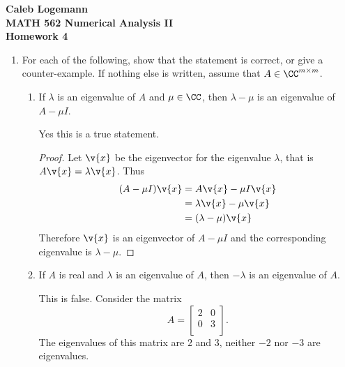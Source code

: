 \documentclass[11pt]{article}
\begin{document}
\noindent \textbf{\Large{Caleb Logemann \\
MATH 562 Numerical Analysis II \\
Homework 4
}}

%
\begin{enumerate}
    \item %
        For each of the following, show that the statement is correct, or give
        a counter-example. 
        If nothing else is written, assume that $A \in \CC^{m \times m}$.
        \begin{enumerate}
            \item %
                If $\lambda$ is an eigenvalue of $A$ and $\mu \in \CC$, then
                $\lambda - \mu$ is an eigenvalue of $A - \mu I$.

                Yes this is a true statement.
                \begin{proof}
                    Let $\v{x}$ be the eigenvector for the eigenvalue $\lambda$,
                    that is $A\v{x} = \lambda \v{x}$.
                    Thus
                    \begin{align*}
                        (A - \mu I)\v{x} &= A\v{x} - \mu I \v{x} \\
                                         &= \lambda \v{x} - \mu \v{x} \\
                                         &= (\lambda - \mu) \v{x}
                    \end{align*}
                    Therefore $\v{x}$ is an eigenvector of $A - \mu I$ and the
                    corresponding eigenvalue is $\lambda - \mu$.
                \end{proof}

            \item %
                If $A$ is real and $\lambda$ is an eigenvalue of $A$, then
                $-\lambda$ is an eigenvalue of $A$.

                This is false.
                Consider the matrix
                \[
                    A =
                    \begin{bmatrix}
                        2 & 0 \\
                        0 & 3 \\
                    \end{bmatrix}.
                \]
                The eigenvalues of this matrix are $2$ and $3$, neither $-2$
                nor $-3$ are eigenvalues.


\end{enumerate}
\end{enumerate}
\end{document}
